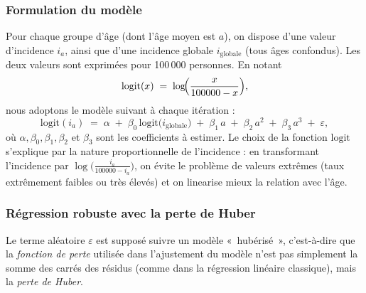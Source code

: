 \subsubsection*{Formulation du modèle}
Pour chaque groupe d'âge (dont l'âge moyen est $a$), on dispose d'une valeur d'incidence $i_a$, ainsi que d'une incidence globale $i_{\mathrm{globale}}$ (tous âges confondus). Les deux valeurs sont exprimées pour 100\,000 personnes. En notant
\[
\text{logit}(x) \;=\; \log\!\Bigl(\frac{x}{100000 - x}\Bigr),
\]
nous adoptons le modèle suivant à chaque itération :
\[
\text{logit}(i_a) 
\;=\; \alpha \;+\; 
\beta_0 \, \text{logit}\bigl(i_{\mathrm{globale}}\bigr) 
\;+\; \beta_1 \, a \;+\; \beta_2\,a^2 \;+\; \beta_3\,a^3 \;+\; \varepsilon,
\]
où $\alpha, \beta_0, \beta_1, \beta_2$ et $\beta_3$ sont les coefficients à estimer. Le choix de la fonction \(\text{logit}\) s'explique par la nature proportionnelle de l'incidence : en transformant l'incidence par \(\log\!\bigl(\frac{i_a}{100000 - i_a}\bigr)\), on évite le problème de valeurs extrêmes (taux extrêmement faibles ou très élevés) et on linearise mieux la relation avec l'âge.

\subsubsection*{Régression robuste avec la perte de Huber}
Le terme aléatoire \(\varepsilon\) est supposé suivre un modèle «~hubérisé~», c’est-à-dire que la \emph{fonction de perte} utilisée dans l'ajustement du modèle n'est pas simplement la somme des carrés des résidus (comme dans la régression linéaire classique), mais la \emph{perte de Huber}. 

